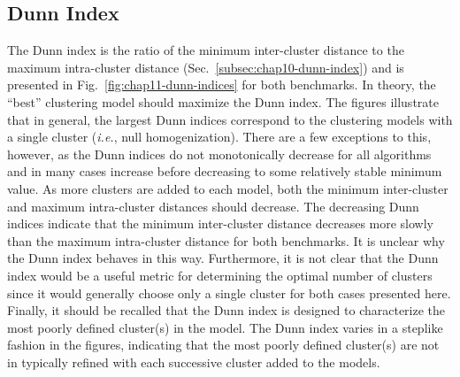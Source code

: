 \clearpage

\subsection{Dunn Index}
\label{subsec:chap11-dunn-index}

The Dunn index is the ratio of the minimum inter-cluster distance to the maximum intra-cluster distance (Sec.~\ref{subsec:chap10-dunn-index}) and is presented in Fig.~\ref{fig:chap11-dunn-indices} for both benchmarks. In theory, the ``best'' clustering model should maximize the Dunn index. The figures illustrate that in general, the largest Dunn indices correspond to the clustering models with a single cluster (\textit{i.e.}, null homogenization). There are a few exceptions to this, however, as the Dunn indices do not monotonically decrease for all algorithms and in many cases increase before decreasing to some relatively stable minimum value. As more clusters are added to each model, both the minimum inter-cluster and maximum intra-cluster distances should decrease. The decreasing Dunn indices indicate that the minimum inter-cluster distance decreases more slowly than the maximum intra-cluster distance for both benchmarks. It is unclear why the Dunn index behaves in this way. Furthermore, it is not clear that the Dunn index would be a useful metric for determining the optimal number of clusters since it would generally choose only a single cluster for both cases presented here. Finally, it should be recalled that the Dunn index is designed to characterize the most poorly defined cluster(s) in the model. The Dunn index varies in a steplike fashion in the figures, indicating that the most poorly defined cluster(s) are not in typically refined with each successive cluster added to the models.

